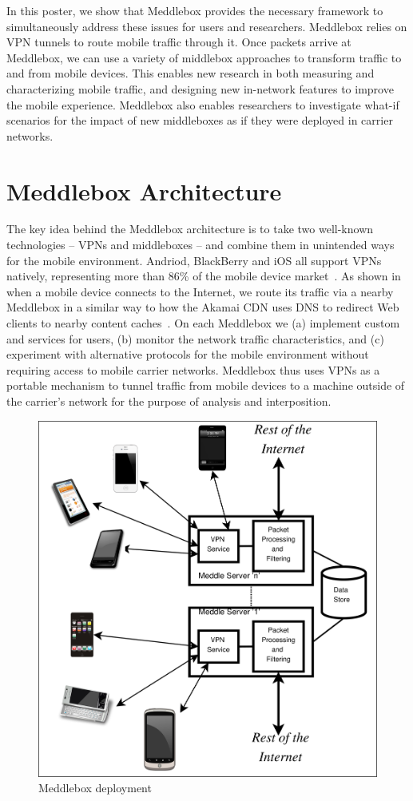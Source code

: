 \documentclass{sig-alternate-10pt}
\newcommand{\meddlebox}{{Meddlebox}\xspace}
\renewcommand{\fref}{\Fref}
\begin{document}
In this poster, we show that \meddlebox provides the necessary
framework to simultaneously address these issues for users and
researchers. \meddlebox relies on VPN tunnels to route mobile traffic
through it. Once packets arrive at \meddlebox, we can use a variety of
middlebox approaches to transform traffic to and from mobile
devices. This enables new research in both measuring and
characterizing mobile traffic, and designing new in-network features
to improve the mobile experience. \meddlebox also enables researchers
to investigate what-if scenarios for the impact of new middleboxes as
if they were deployed in carrier networks.   
 
\section{\meddlebox Architecture}

The key idea behind the \meddlebox architecture is to take two
well-known technologies -- VPNs and middleboxes -- and combine them
in unintended ways for the mobile environment. Andriod, BlackBerry and
iOS all support VPNs natively, representing more than 86\% of the
mobile device market~\cite{gartner-phone-share}. As shown in
\fref{fig:MeddleboxDeployment} when a mobile device connects to the
Internet, we route its traffic via a nearby \meddlebox in a similar
way to how the Akamai CDN uses DNS to redirect Web clients to nearby
content caches~\cite{akamai:cdn}. On each \meddlebox we (a) implement
custom and services for users, (b) monitor the network traffic
characteristics, and (c) experiment with alternative protocols for the
mobile environment without requiring access to mobile carrier
networks. \meddlebox thus uses VPNs as a portable mechanism to tunnel
traffic from mobile devices to a machine outside of the carrier's
network for the purpose of analysis and interposition.    

\begin{figure}
  \centering
  \includegraphics[width=0.6\columnwidth]{figures/meddle-servers.pdf}
  \caption{Meddlebox deployment}
  \label{fig:MeddleboxDeployment}
\end{figure}
\end{document}
